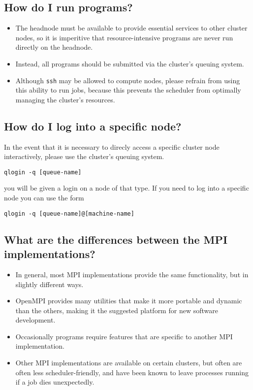 \documentclass[12pt,a4paper]{article}
\begin{document}
\subsection*{How do I run programs?}
\begin{itemize}
    \item The headnode must be available to provide essential services to other cluster nodes, so it is imperitive that resource-intensive programs are never run directly on the headnode.
    \item Instead, all programs should be submitted via the cluster's queuing system.
    \item Although \texttt{ssh} may be allowed to compute nodes, please refrain from using this ability to run jobs, because this prevents the scheduler from optimally managing the cluster's resources.
\end{itemize}

\subsection*{How do I log into a specific node?}
In the event that it is necessary to direcly access a specific cluster node interactively, please use the cluster's queuing system.
\begin{verbatim}
qlogin -q [queue-name]
\end{verbatim}
you will be given a login on a node of that type.
If you need to log into a specific node you can use the form
\begin{verbatim}
qlogin -q [queue-name]@[machine-name]
\end{verbatim}

\subsection*{What are the differences between the MPI implementations?}
\begin{itemize}
    \item In general, most MPI implementations provide the same functionality, but in slightly different ways.
    \item OpenMPI provides many utilities that make it more portable and dynamic than the others, making it the suggested platform for new software development.
    \item Occasionally programs require features that are specific to another MPI implementation.
    \item Other MPI implementations are available on certain clusters, but often are often less scheduler-friendly, and have been known to leave processes running if a job dies unexpectedly.
\end{itemize}
\end{document}
